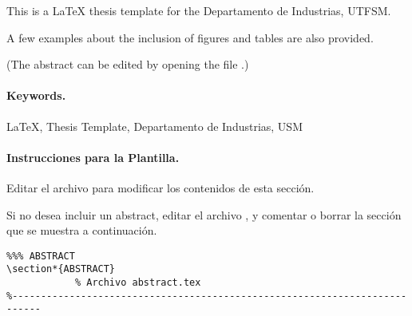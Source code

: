 
This is a \LaTeX{} thesis template for the Departamento de Industrias, UTFSM.

A few examples about the inclusion of figures and tables are also provided.

(The abstract can be edited by opening the file .)

\vspace{20mm}

\paragraph{Keywords.}
\LaTeX{}, Thesis Template, Departamento de Industrias, USM

\vspace{20mm}


\paragraph{Instrucciones para la Plantilla.}

Editar el archivo  para modificar los contenidos de esta sección.

Si no desea incluir un abstract, editar el archivo , y comentar o borrar la sección que se muestra a continuación.

\begin{Verbatim}[frame=lines, label=\inlinecode{/latex/memoria.tex} (extracto)
				, fontsize=\footnotesize
				, baselinestretch=1
				, formatcom=\color{gray}]
%---------------------------------------------------------------------------
%%% ABSTRACT
\section*{ABSTRACT}
			% Archivo abstract.tex
%---------------------------------------------------------------------------
\end{Verbatim}